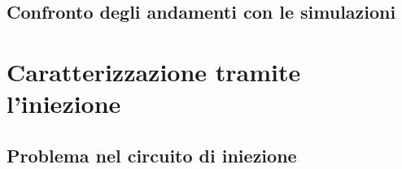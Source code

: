 \documentclass[10pt,a4paper,twoside]{report}
\begin{document}
\subsection{Confronto degli andamenti con le simulazioni}


\section{Caratterizzazione tramite l'iniezione}

\begin{comment}
Nel prototipo sotto studio, il chip W14R12, si sono rilevate fin da subito alcune problematiche legate ai pixel della matrice, sia per quel che riguarda la parte analogica che quella digitale.
In particolare, a differenza del suo predecessore TJ-Monopix1, TJ-Monopix2 è equipaggiato da un circuito che permette il \textit{tuning della threshold}, ossia di correggere, anche se di pochi DAC, la threshold di ciascun pixel, in modo da avere una threshold globale più uniforme possibile, o comunque con una dispersione piccola quanto possibile.

Preliminarmente però, è necessario studiare la distribuzione della threshold su tutta la matrice e noi abbiamo analizzato separatamente i 4 flavor, per poter anche studiare le loro principali differenze di funzionamento e performance.

Il fine ultimo di questa misura, è anche quello di riuscire a caratterizzare il comportamento di ciascun pixel, ad una carica iniettata equivalente all'energia tipica rilasciata dagli elettroni emessi dal decadimento di materiali radioattivi, e in particolare quelli dovuti alla cattura elettronica nel \ch{^55Fe}, le cui linee di emissione sono abbastanza piccate da permettere poi di confrontare i dati più facilmente. Come spiegato meglio nel paragrafo (?????), il \ch{^55Fe} ha una prima linea di emissione a  5.9 KeV che corrisponde in media all'incirca a 1616 $e^{-}$ generati (nel pixel?). Per questa ragione, nelle misure di iniezione è necessario, in base ai valori di conversione tra DAC ed $e^{-}$ SCRIVI, arrivare ad iniettare cariche in modo da studiare il comportamento dei pixel in queste regioni maggiormente interessanti. 
\end{comment}

\subsection{Problema nel circuito di iniezione}
\end{document}
